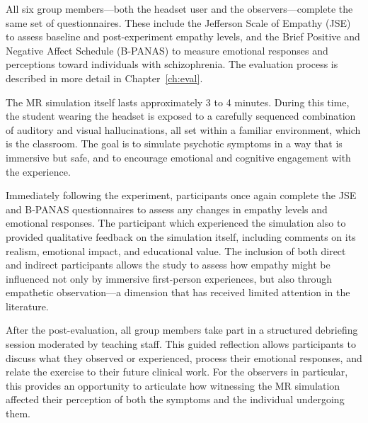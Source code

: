 \vspace{1em}

All six group members—both the headset user and the observers—complete the same set of questionnaires. These include the Jefferson Scale of Empathy (JSE) \cite{Hojat2002} to assess baseline and post-experiment empathy levels, and the Brief Positive and Negative Affect Schedule (B-PANAS) \cite{Boiroux2024} to measure emotional responses and perceptions toward individuals with schizophrenia. The evaluation process is described in more detail in Chapter~\ref{ch:eval}.

The MR simulation itself lasts approximately 3 to 4 minutes. During this time, the student wearing the headset is exposed to a carefully sequenced combination of auditory and visual hallucinations, all set within a familiar environment, which is the classroom. The goal is to simulate psychotic symptoms in a way that is immersive but safe, and to encourage emotional and cognitive engagement with the experience.

\vspace{1em}

Immediately following the experiment, participants once again complete the JSE and B-PANAS questionnaires to assess any changes in empathy levels and emotional responses. The participant which experienced the simulation also to provided qualitative feedback on the simulation itself, including comments on its realism, emotional impact, and educational value. The inclusion of both direct and indirect participants allows the study to assess how empathy might be influenced not only by immersive first-person experiences, but also through empathetic observation—a dimension that has received limited attention in the literature.

\vspace{1em}

After the post-evaluation, all group members take part in a structured debriefing session moderated by teaching staff. This guided reflection allows participants to discuss what they observed or experienced, process their emotional responses, and relate the exercise to their future clinical work. For the observers in particular, this provides an opportunity to articulate how witnessing the MR simulation affected their perception of both the symptoms and the individual undergoing them.


